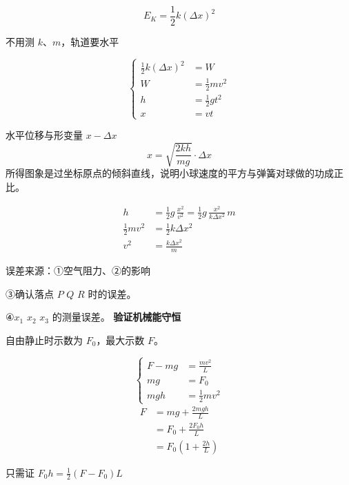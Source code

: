 \[ E_K=\frac12 k(\Delta x)^2 \]

不用测 $k$、$m$，轨道要水平


\[
\left\{\begin{aligned}
\tfrac12 k(\Delta x)^2&=W\\
W&=\tfrac12 mv^2\\
h&=\tfrac12 gt^2\\
x&=vt
\end{aligned}\right.
\]

水平位移与形变量 $x-\Delta x$
\[ x=\sqrt{\frac{2kh}{mg}}\cdot\Delta x \]
所得图象是过坐标原点的倾斜直线，说明小球速度的平方与弹簧对球做的功成正比。

\begin{align*}
h&=\frac12 g\,\frac{x^2}{v^2}=\frac12 g\,\frac{x^2}{k\Delta x^2}\,m\\
\frac12 mv^2&=\frac12 k\Delta x^2\\
v^2&=\frac{k\Delta x^2}{m}
\end{align*}

误差来源：①空气阻力、②的影响

③确认落点 $P$ $Q$ $R$ 时的误差。 %

④$x_1$ $x_2$ $x_3$ 的测量误差。
\textbf{验证机械能守恒}


自由静止时示数为 $F_0$，最大示数 $F$。

\[
\left\{\begin{aligned}
F-mg&=\frac{mv^2}{L}\\
mg&=F_0\\
mgh&=\tfrac12 mv^2
\end{aligned}\right.
\]
\begin{align*}
F&=mg+\frac{2mgh}{L}\\
&=F_0+\frac{2F_0h}{L}\\
&=F_0\left(1+\frac{2h}{L}\right)
\end{align*}

\begin{keybox}
只需证 $F_0h=\frac12(F-F_0)L$ %
\end{keybox}

